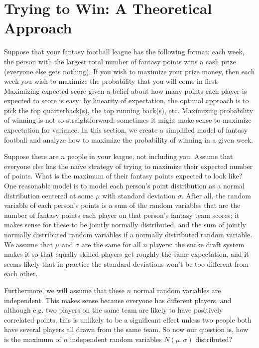 \documentclass[12pt, final, onecolumn, titlepage]{article}
\theoremstyle{definition}
\begin{document}
\section{Trying to Win: A Theoretical Approach}
Suppose that your fantasy football league has the following format: each week, the person with the largest total number of fantasy points wins a cash prize (everyone else gets nothing). If you wish to maximize your prize money, then each week you wish to maximize the probability that you will come in first. Maximizing expected score given a belief about how many points each player is expected to score is easy: by linearity of expectation, the optimal approach is to pick the top quarterback(s), the top running back(s), etc. Maximizing probability of winning is not so straightforward: sometimes it might make sense to maximize expectation for variance. In this section, we create a simplified model of fantasy football and analyze how to maximize the probability of winning in a given week.

Suppose there are $n$ people in your league, not including you. Assume that everyone else has the na\"{i}ve strategy of trying to maximize their expected number of points. What is the maximum of their fantasy points expected to look like? One reasonable model is to model each person's point distribution as a normal distribution centered at some $\mu$ with standard deviation $\sigma$. After all, the random variable of each person's points is a sum of the random variables that are the number of fantasy points each player on that person's fantasy team scores; it makes sense for these to be jointly normally distributed, and the sum of jointly normally distributed random variables if a normally distributed random variable. We assume that $\mu$ and $\sigma$ are the same for all $n$ players: the snake draft system makes it so that equally skilled players get roughly the same expectation, and it seems likely that in practice the standard deviations won't be too different from each other.

Furthermore, we will assume that these $n$ normal random variables are independent. This makes sense because everyone has different players, and although e.g. two players on the same team are likely to have positively correlated points, this is unlikely to be a significant effect unless two people both have several players all drawn from the same team. So now our question is, how is the maximum of $n$ independent random variables $N(\mu, \sigma)$ distributed?
\end{document}
